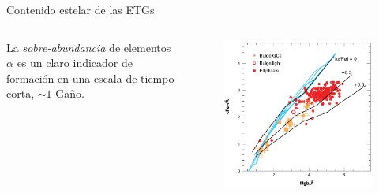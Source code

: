 \documentclass[xcolor=dvipsnames,4pt]{beamer}
\newenvironment{changemargin}[2]{%
  \begin{list}{}{%
    \setlength{\topsep}{0pt}%
    \setlength{\leftmargin}{#1}%
    \setlength{\rightmargin}{#2}%
    \setlength{\listparindent}{\parindent}%
    \setlength{\itemindent}{\parindent}%
    \setlength{\parsep}{\parskip}%
  }%
\item[]}{\end{list}}
\begin{document}
\begin{frame}{Contenido estelar de las ETGs}
\begin{changemargin}{-1cm}{-1cm}
\begin{columns}
\small
La \emph{sobre-abundancia} de elementos $\alpha$ es un claro indicador de formación en una escala de tiempo corta, $\sim1$ Gaño.
\begin{figure}
\includegraphics[scale=0.73]{img/alfa_enhance.png}
\end{figure}
\end{columns}
\end{changemargin}
\end{frame}
\end{document}
